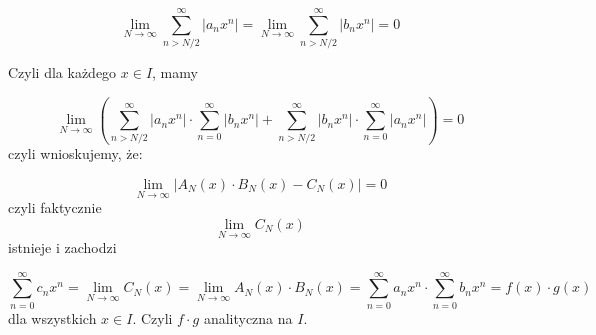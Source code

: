 \documentclass{article}
\begin{document}
$$ \lim_{N \to \infty} \sum_{n>N/2}^{\infty}|a_nx^n| = \lim_{N\to \infty} \sum_{n>N/2}^{\infty}|b_nx^n| = 0$$

Czyli dla każdego $x\in I$, mamy

$$ \lim_{N\to \infty} \left(
\sum_{n>N/2}^{\infty}\left|a_nx^n\right|\cdot\sum_{n=0}^{\infty}|b_nx^n| + 
\sum_{n>N/2}^{\infty}\left|b_nx^n\right|\cdot\sum_{n=0}^{\infty}|a_nx^n| \right) 
= 0
$$
czyli wnioskujemy, że:

$$\lim_{N\to\infty}\left| A_N(x)\cdot B_N(x) - C_N(x) \right| = 0$$
czyli faktycznie 
$$\lim_{N\to\infty}C_N(x)$$ istnieje i zachodzi

$$\sum_{n=0}^{\infty}c_nx^n = \lim_{N\to\infty}C_N(x) = \lim_{N\to\infty}A_N(x)\cdot B_N(x) = 
\sum_{n=0}^{\infty}a_nx^n \cdot \sum_{n=0}^{\infty}b_nx^n = f(x)\cdot g(x)$$
dla wszystkich $ x\in I$. Czyli $f \cdot g$ analityczna na $I$.
\end{document}
